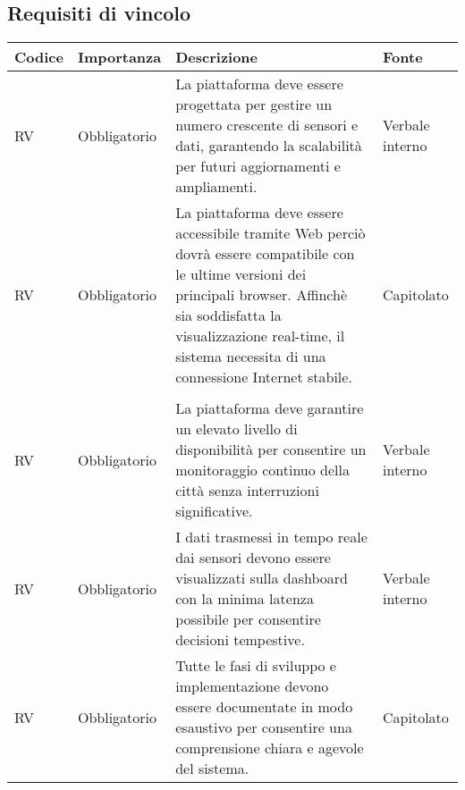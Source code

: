 \subsection{Requisiti di vincolo}
\setcounter{rowcounter}{0}
\begin{longtable}{|C{1cm}|C{2cm}|>{\raggedright}m{5cm}|C{2cm}|}
    \hline
    \textbf{Codice}                                & \textbf{Importanza} & \textbf{Descrizione}                                                                                                                                                                               & \textbf{Fonte}  \\
    \hline
    RV                          & Obbligatorio        & La piattaforma deve essere progettata per gestire un numero crescente di sensori e dati, garantendo la scalabilità per futuri aggiornamenti e ampliamenti.                                         & Verbale interno \\
    \hline
     RV & Obbligatorio        & La piattaforma deve essere accessibile tramite Web perciò dovrà essere compatibile con le ultime versioni dei principali browser. Affinchè
    sia soddisfatta la visualizzazione real-time, il sistema necessita di una
    connessione Internet stabile.                  & Capitolato                                                                                                                                                                                                                                 \\                                                                                                                                                                                                                        \\
    \hline
     RV & Obbligatorio        & La piattaforma deve garantire un elevato livello di disponibilità per consentire un monitoraggio continuo della città senza interruzioni significative.                                            & Verbale interno \\
    \hline
     RV & Obbligatorio        & I dati trasmessi in tempo reale dai sensori devono essere visualizzati sulla dashboard con la minima latenza possibile per consentire decisioni tempestive.                                        & Verbale interno \\
    \hline
     RV & Obbligatorio        & Tutte le fasi di sviluppo e implementazione devono essere documentate in modo esaustivo per consentire una comprensione chiara e agevole del sistema.                                              & Capitolato      \\

\end{longtable}
